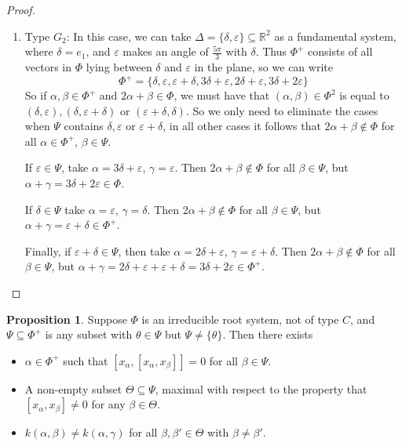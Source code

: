 \documentclass[12pt,a4paper]{article}
\theoremstyle{definition}
\newtheorem{propn}[thm]{Proposition}
\theoremstyle{remark}
\theoremstyle{custthm}
\begin{document}
\begin{proof}
\begin{enumerate}
    \item Type $G_2$: In this case, we can take $\Delta=\{\delta,\varepsilon\}\subseteq\mathbb{R}^2$ as a fundamental system, where $\delta=e_1$, and $\varepsilon$ makes an angle of $\frac{5\pi}{3}$ with $\delta$. Thus $\Phi^+$ consists of all vectors in $\Phi$ lying between $\delta$ and $\varepsilon$ in the plane, so we can write $$\Phi^+=\{\delta,\varepsilon,\varepsilon+\delta,3\delta+\varepsilon,2\delta+\varepsilon,3\delta+2\varepsilon\}$$ So if $\alpha,\beta\in\Phi^+$ and $2\alpha+\beta\in\Phi$, we must have that $(\alpha,\beta)\in\Phi^2$ is equal to $(\delta,\varepsilon),(\delta,\varepsilon+\delta)$ or $(\varepsilon+\delta,\delta)$. So we only need to eliminate the cases when $\Psi$ contains $\delta,\varepsilon$ or $\varepsilon+\delta$, in all other cases it follows that $2\alpha+\beta\notin\Phi$ for all $\alpha\in\Phi^+$, $\beta\in\Psi$.

    If $\varepsilon\in\Psi$, take $\alpha=3\delta+\varepsilon$, $\gamma=\varepsilon$. Then $2\alpha+\beta\notin\Phi$ for all $\beta\in\Psi$, but $\alpha+\gamma=3\delta+2\varepsilon\in\Phi$.
    
    If $\delta\in\Psi$ take $\alpha=\varepsilon$, $\gamma=\delta$. Then $2\alpha+\beta\notin\Phi$ for all $\beta\in\Psi$, but $\alpha+\gamma=\varepsilon+\delta\in\Phi^+$. 
    
    Finally, if $\varepsilon+\delta\in\Psi$, then take $\alpha=2\delta+\varepsilon$, $\gamma=\varepsilon+\delta$. Then $2\alpha+\beta\notin\Phi$ for all $\beta\in\Psi$, but $\alpha+\gamma=2\delta+\varepsilon+\varepsilon+\delta=3\delta+2\varepsilon\in\Phi^+$.\qedhere
    
\end{enumerate}

\end{proof}

\begin{propn}\label{propn: step 2 for irreducible root systems}
Suppose $\Phi$ is an irreducible root system, not of type $C$, and $\Psi\subseteq \Phi^+$ is any subset with $\theta\in\Psi$ but $\Psi\neq\{\theta\}$. Then there exists
\begin{itemize}
    \item $\alpha\in\Phi^+$ such that $[x_\alpha,[x_\alpha,x_\beta]]=0$ for all $\beta\in\Psi$.

    \item A non-empty subset $\Theta\subseteq\Psi$, maximal with respect to the property that $[x_\alpha,x_\beta]\neq 0$ for any $\beta\in\Theta$. 
    
    \item $k(\alpha,\beta)\neq k(\alpha,\gamma)$ for all $\beta,\beta'\in\Theta$ with $\beta\neq\beta'$.
\end{itemize}
\end{propn}
\end{document}
